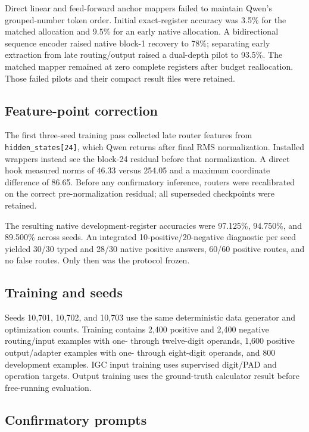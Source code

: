\documentclass[11pt]{article}
\newcommand{\code}[1]{\texttt{#1}}
\begin{document}
Direct linear and feed-forward anchor mappers failed to maintain Qwen's
grouped-number token order. Initial exact-register accuracy was 3.5\% for the
matched allocation and 9.5\% for an early native allocation. A bidirectional
sequence encoder raised native block-1 recovery to 78\%; separating early
extraction from late routing/output raised a dual-depth pilot to 93.5\%.
The matched mapper remained at zero complete registers after budget
reallocation. Those failed pilots and their compact result files were retained.

\subsection{Feature-point correction}

The first three-seed training pass collected late router features from
\code{hidden\_states[24]}, which Qwen returns after final RMS normalization.
Installed wrappers instead see the block-24 residual before that
normalization. A direct hook measured norms of 46.33 versus 254.05 and a
maximum coordinate difference of 86.65. Before any confirmatory inference,
routers were recalibrated on the correct pre-normalization residual; all
superseded checkpoints were retained.

The resulting native development-register accuracies were 97.125\%, 94.750\%,
and 89.500\% across seeds. An integrated 10-positive/20-negative diagnostic
per seed yielded 30/30 typed and 28/30 native positive answers, 60/60 positive
routes, and no false routes. Only then was the protocol frozen.

\subsection{Training and seeds}

Seeds 10,701, 10,702, and 10,703 use the same deterministic data generator and
optimization counts. Training contains 2,400 positive and 2,400 negative
routing/input examples with one- through twelve-digit operands, 1,600
positive output/adapter examples with one- through eight-digit operands, and
800 development examples. IGC input training uses supervised digit/PAD and
operation targets. Output training uses the ground-truth calculator result
before free-running evaluation.

\subsection{Confirmatory prompts}
\end{document}
